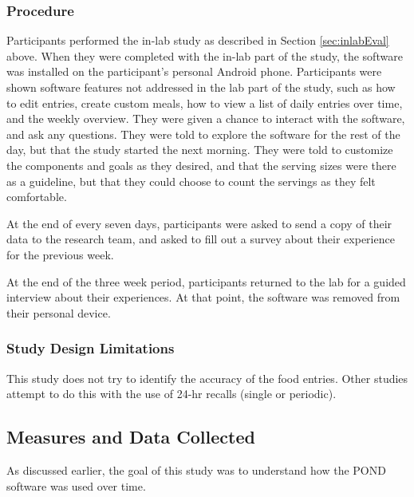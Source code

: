 \subsubsection{Procedure}
Participants performed the in-lab study as described in Section \ref{sec:inlabEval} above. When they were completed with the in-lab part of the study, the software was installed on the participant's personal Android phone. Participants were shown software features not addressed in the lab part of the study, such as how to edit entries, create custom meals, how to view a list of daily entries over time, and the weekly overview. They were given a chance to interact with the software, and ask any questions. They were told to explore the software for the rest of the day, but that the study started the next morning. They were told to customize the components and goals as they desired, and that the serving sizes were there as a guideline, but that they could choose to count the servings as they felt comfortable. 

At the end of every seven days, participants were asked to send a copy of their data to the research team, and asked to fill out a survey about their experience for the previous week. 

At the end of the three week period, participants returned to the lab for a guided interview about their experiences. At that point, the software was removed from their personal device. 

\subsubsection{Study Design Limitations}

This study does not try to identify the accuracy of the food entries. Other studies attempt to do this with the use of 24-hr recalls (single or periodic). 

\subsection{Measures and Data Collected}
As discussed earlier, the goal of this study was to understand how the POND software was used over time. 

